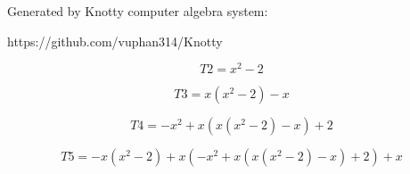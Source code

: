 \documentclass[letterpaper, 10pt]{extarticle}
\begin{document}
Generated by Knotty computer algebra system:

https://github.com/vuphan314/Knotty

\hrulefill

\begin{dmath*}
T2 =
    x^{2} - 2
\end{dmath*}


\begin{dmath*}
T3 =
    x \left(x^{2} - 2\right) - x
\end{dmath*}


\begin{dmath*}
T4 =
    - x^{2} + x \left(x \left(x^{2} - 2\right) - x\right) + 2
\end{dmath*}


\begin{dmath*}
T5 =
    - x \left(x^{2} - 2\right) + x \left(- x^{2} + x \left(x \left(x^{2} - 2\right) - x\right) + 2\right) + x
\end{dmath*}
\end{document}
